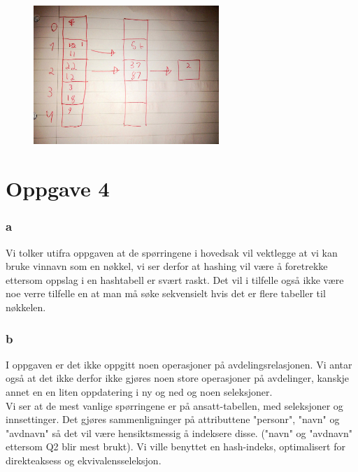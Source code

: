 \documentclass[a4paper, 10pt]{article}
\begin{document}
\begin{figure}[H]
    \begin{center}
        \includegraphics[width=7cm] {img/1493420_10153958793070161_995978780_o.jpg}
    \end{center}
\end{figure}

\newpage
\section*{Oppgave 4}
\subsubsection*{a}
Vi tolker utifra oppgaven at de spørringene i hovedsak vil vektlegge at vi kan bruke vinnavn som en nøkkel, vi ser derfor at hashing vil være å foretrekke ettersom oppslag i en hashtabell er svært raskt. Det vil i tilfelle også ikke være noe verre tilfelle en at man må søke sekvensielt hvis det er flere tabeller til nøkkelen.

\subsubsection*{b}


I oppgaven er det ikke oppgitt noen operasjoner på avdelingsrelasjonen. Vi antar også at det ikke derfor ikke gjøres noen store operasjoner på avdelinger, kanskje annet en en liten oppdatering i ny og ned og noen seleksjoner.\\

Vi ser at de mest vanlige spørringene er på ansatt-tabellen, med seleksjoner og innsettinger. Det gjøres sammenligninger på attributtene "personr", "navn" og "avdnavn" så det vil være hensiktsmessig å indeksere disse. ("navn" og "avdnavn" ettersom Q2 blir mest brukt). Vi ville benyttet en hash-indeks, optimalisert for direkteaksess og ekvivalensseleksjon.
\end{document}

